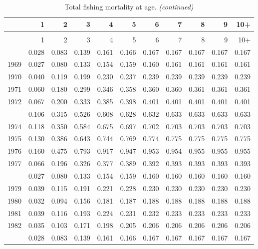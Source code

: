 \documentclass[
]{article}
\begin{document}
\begin{longtable}[t]{lrrrrrrrrrr}
\caption{\label{tab:FAA-tot-table}Total fishing mortality at age.}\\
\toprule
  & 1 & 2 & 3 & 4 & 5 & 6 & 7 & 8 & 9 & 10+\\
\midrule
\endfirsthead
\caption[]{Total fishing mortality at age. \textit{(continued)}}\\
\toprule
  & 1 & 2 & 3 & 4 & 5 & 6 & 7 & 8 & 9 & 10+\\
\midrule
\endhead

\endfoot
\bottomrule
\endlastfoot
1968 & 0.028 & 0.083 & 0.139 & 0.161 & 0.166 & 0.167 & 0.167 & 0.167 & 0.167 & 0.167\\
1969 & 0.027 & 0.080 & 0.133 & 0.154 & 0.159 & 0.160 & 0.161 & 0.161 & 0.161 & 0.161\\
1970 & 0.040 & 0.119 & 0.199 & 0.230 & 0.237 & 0.239 & 0.239 & 0.239 & 0.239 & 0.239\\
1971 & 0.060 & 0.180 & 0.299 & 0.346 & 0.358 & 0.360 & 0.360 & 0.361 & 0.361 & 0.361\\
1972 & 0.067 & 0.200 & 0.333 & 0.385 & 0.398 & 0.401 & 0.401 & 0.401 & 0.401 & 0.401\\
\addlinespace
1973 & 0.106 & 0.315 & 0.526 & 0.608 & 0.628 & 0.632 & 0.633 & 0.633 & 0.633 & 0.633\\
1974 & 0.118 & 0.350 & 0.584 & 0.675 & 0.697 & 0.702 & 0.703 & 0.703 & 0.703 & 0.703\\
1975 & 0.130 & 0.386 & 0.643 & 0.744 & 0.769 & 0.774 & 0.775 & 0.775 & 0.775 & 0.775\\
1976 & 0.160 & 0.475 & 0.793 & 0.917 & 0.947 & 0.953 & 0.954 & 0.955 & 0.955 & 0.955\\
1977 & 0.066 & 0.196 & 0.326 & 0.377 & 0.389 & 0.392 & 0.393 & 0.393 & 0.393 & 0.393\\
\addlinespace
1978 & 0.027 & 0.080 & 0.133 & 0.154 & 0.159 & 0.160 & 0.160 & 0.160 & 0.160 & 0.160\\
1979 & 0.039 & 0.115 & 0.191 & 0.221 & 0.228 & 0.230 & 0.230 & 0.230 & 0.230 & 0.230\\
1980 & 0.032 & 0.094 & 0.156 & 0.181 & 0.187 & 0.188 & 0.188 & 0.188 & 0.188 & 0.188\\
1981 & 0.039 & 0.116 & 0.193 & 0.224 & 0.231 & 0.232 & 0.233 & 0.233 & 0.233 & 0.233\\
1982 & 0.035 & 0.103 & 0.171 & 0.198 & 0.205 & 0.206 & 0.206 & 0.206 & 0.206 & 0.206\\
\addlinespace
1983 & 0.028 & 0.083 & 0.139 & 0.161 & 0.166 & 0.167 & 0.167 & 0.167 & 0.167 & 0.167\\

\end{longtable}
\end{document}
